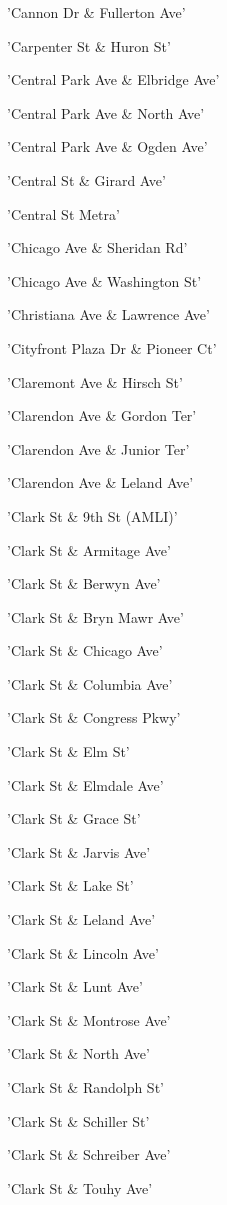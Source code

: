 \documentclass[11pt]{article}
\begin{document}
\begin{enumerate*}
\item 'Cannon Dr \& Fullerton Ave'
\item 'Carpenter St \& Huron St'
\item 'Central Park Ave \& Elbridge Ave'
\item 'Central Park Ave \& North Ave'
\item 'Central Park Ave \& Ogden Ave'
\item 'Central St \& Girard Ave'
\item 'Central St Metra'
\item 'Chicago Ave \& Sheridan Rd'
\item 'Chicago Ave \& Washington St'
\item 'Christiana Ave \& Lawrence Ave'
\item 'Cityfront Plaza Dr \& Pioneer Ct'
\item 'Claremont Ave \& Hirsch St'
\item 'Clarendon Ave \& Gordon Ter'
\item 'Clarendon Ave \& Junior Ter'
\item 'Clarendon Ave \& Leland Ave'
\item 'Clark St \& 9th St (AMLI)'
\item 'Clark St \& Armitage Ave'
\item 'Clark St \& Berwyn Ave'
\item 'Clark St \& Bryn Mawr Ave'
\item 'Clark St \& Chicago Ave'
\item 'Clark St \& Columbia Ave'
\item 'Clark St \& Congress Pkwy'
\item 'Clark St \& Elm St'
\item 'Clark St \& Elmdale Ave'
\item 'Clark St \& Grace St'
\item 'Clark St \& Jarvis Ave'
\item 'Clark St \& Lake St'
\item 'Clark St \& Leland Ave'
\item 'Clark St \& Lincoln Ave'
\item 'Clark St \& Lunt Ave'
\item 'Clark St \& Montrose Ave'
\item 'Clark St \& North Ave'
\item 'Clark St \& Randolph St'
\item 'Clark St \& Schiller St'
\item 'Clark St \& Schreiber Ave'
\item 'Clark St \& Touhy Ave'

\end{enumerate*}
\end{document}
